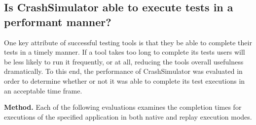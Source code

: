 
\subsection{Is CrashSimulator able to execute tests in a performant manner?}
\label{sec-perf}


One key attribute of successful testing tools is that they be able to
complete their tests in a timely manner.  If a tool takes too long to
complete its tests users will be less likely to run it frequently, or at
all, reducing the tools overall usefulness dramatically. To this end, the
performance of CrashSimulator was evaluated in order to determine whether
or not it was able to complete its test executions in an acceptable time
frame.  

{\bf Method.} Each of the following evaluations examines the completion
times for executions of the specified application in both
native and replay execution modes.


